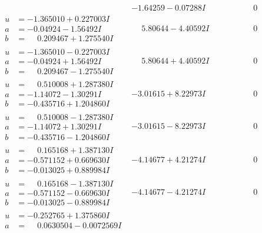 \documentclass[1p]{elsarticle_modified}
\theoremstyle{definition}
\begin{document}
$$\begin{array}{c|c|c}
 & -1.64259 - 0.07288 I & \phantom{-0.000000 } 0 \\ \hline\begin{aligned}
u &= -1.365010 + 0.227003 I \\
a &= -0.04924 - 1.56492 I \\
b &= \phantom{-}0.209467 + 1.275540 I\end{aligned}
 & \phantom{-}5.80644 - 4.40592 I & \phantom{-0.000000 } 0 \\ \hline\begin{aligned}
u &= -1.365010 - 0.227003 I \\
a &= -0.04924 + 1.56492 I \\
b &= \phantom{-}0.209467 - 1.275540 I\end{aligned}
 & \phantom{-}5.80644 + 4.40592 I & \phantom{-0.000000 } 0 \\ \hline\begin{aligned}
u &= \phantom{-}0.510008 + 1.287380 I \\
a &= -1.14072 - 1.30291 I \\
b &= -0.435716 + 1.204860 I\end{aligned}
 & -3.01615 + 8.22973 I & \phantom{-0.000000 } 0 \\ \hline\begin{aligned}
u &= \phantom{-}0.510008 - 1.287380 I \\
a &= -1.14072 + 1.30291 I \\
b &= -0.435716 - 1.204860 I\end{aligned}
 & -3.01615 - 8.22973 I & \phantom{-0.000000 } 0 \\ \hline\begin{aligned}
u &= \phantom{-}0.165168 + 1.387130 I \\
a &= -0.571152 + 0.669630 I \\
b &= -0.013025 + 0.889984 I\end{aligned}
 & -4.14677 + 4.21274 I & \phantom{-0.000000 } 0 \\ \hline\begin{aligned}
u &= \phantom{-}0.165168 - 1.387130 I \\
a &= -0.571152 - 0.669630 I \\
b &= -0.013025 - 0.889984 I\end{aligned}
 & -4.14677 - 4.21274 I & \phantom{-0.000000 } 0 \\ \hline\begin{aligned}
u &= -0.252765 + 1.375860 I \\
a &= \phantom{-}0.0630504 - 0.0072569 I \\

\end{aligned}
\end{array}$$
\end{document}
